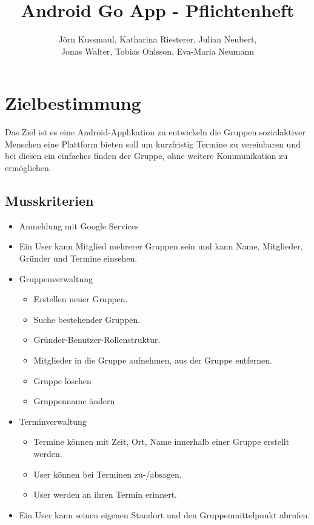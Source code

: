 \documentclass{scrartcl}
\title{Android Go App - Pflichtenheft}
\author{Jörn Kussmaul, Katharina Riesterer, Julian Neubert,\\ Jonas Walter, Tobias Ohlsson, Eva-Maria Neumann}
\begin{document}
	\maketitle
	\newpage
	
	\tableofcontents
	\newpage
	\section{Zielbestimmung}
	Das Ziel ist es eine Android-Applikation zu entwickeln die Gruppen sozialaktiver Menschen eine Plattform bieten soll um kurzfristig Termine zu vereinbaren und bei diesen ein einfaches finden der Gruppe, ohne weitere Kommunikation zu ermöglichen.
	\subsection{Musskriterien}
	\begin{itemize}
		\item Anmeldung mit Google Services
		\item Ein User kann Mitglied mehrerer Gruppen sein und kann Name, Mitglieder, Gründer und Termine einsehen.
		\item Gruppenverwaltung
		\begin{itemize}
			\item Erstellen neuer Gruppen.
			\item Suche bestehender Gruppen.
			\item Gründer-Benutzer-Rollenstruktur.
			\item Mitglieder in die Gruppe aufnehmen, aus der Gruppe entfernen.
			\item Gruppe löschen
			\item Gruppenname ändern
		\end{itemize}
		\item Terminverwaltung
		\begin{itemize}
			\item Termine können mit Zeit, Ort, Name innerhalb einer Gruppe erstellt werden.
			\item User können bei Terminen zu-/absagen.
			\item User werden an ihren Termin erinnert.
		\end{itemize}
		\item Ein User kann seinen eigenen Standort und den Gruppenmittelpunkt abrufen.	
	\end{itemize}
\end{document}
